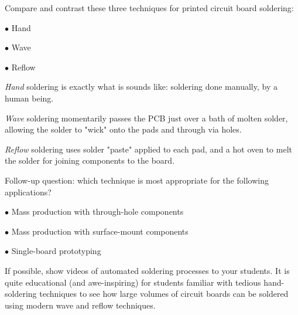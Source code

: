 

Compare and contrast these three techniques for printed circuit board soldering:

\medskip
\item{$\bullet$} Hand
\item{$\bullet$} Wave
\item{$\bullet$} Reflow
\medskip







{\it Hand} soldering is exactly what is sounds like: soldering done manually, by a human being.

\vskip 10pt

{\it Wave} soldering momentarily passes the PCB just over a bath of molten solder, allowing the solder to "wick" onto the pads and through via holes.

\vskip 10pt

{\it Reflow} soldering uses solder "paste" applied to each pad, and a hot oven to melt the solder for joining components to the board.

\vskip 20pt

Follow-up question: which technique is most appropriate for the following applications?

\medskip
\item{$\bullet$} Mass production with through-hole components
\item{$\bullet$} Mass production with surface-mount components
\item{$\bullet$} Single-board prototyping
\medskip







If possible, show videos of automated soldering processes to your students.  It is quite educational (and awe-inspiring) for students familiar with tedious hand-soldering techniques to see how large volumes of circuit boards can be soldered using modern wave and reflow techniques.




